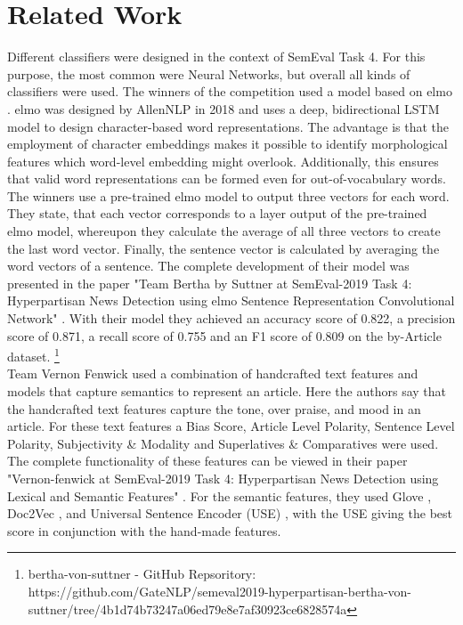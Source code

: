 \documentclass[a4paper, 11pt,titlepage,oneside,openany]{book}
\begin{document}
\chapter{Related Work}
Different classifiers were designed in the context of SemEval Task 4. For this purpose, the most common were Neural Networks, but overall all kinds of classifiers were used. 
\indent The winners of the competition used a model based on \gls{elmo} \cite{elmo}. \gls{elmo} was designed by AllenNLP in 2018 and uses a deep, bidirectional LSTM model to design character-based word representations. The advantage is that the employment of character embeddings makes it possible to identify morphological features which word-level embedding might overlook. Additionally, this ensures that valid word representations can be formed even for out-of-vocabulary words. The winners use a pre-trained \gls{elmo} model to output three vectors for each word. They state, that each vector corresponds to a layer output of the pre-trained \gls{elmo} model, whereupon they calculate the average of all three vectors to create the last word vector. Finally, the sentence vector is calculated by averaging the word vectors of a sentence. The complete development of their model was presented in the paper "Team Bertha by Suttner at SemEval-2019 Task 4: Hyperpartisan News Detection using \gls{elmo} Sentence Representation Convolutional Network" \cite{gewinner}. With their model they achieved an accuracy score of 0.822, a precision score of 0.871, a recall score of 0.755 and an F1 score of 0.809 on the by-Article dataset. \footnote{bertha-von-suttner - GitHub Repsoritory: https://github.com/GateNLP/semeval2019-hyperpartisan-bertha-von-suttner/tree/4b1d74b73247a06ed79e8e7af30923ce6828574a} \\
\indent Team Vernon Fenwick used a combination of handcrafted text features and models that capture semantics to represent an article. Here the authors say that the handcrafted text features capture the tone, over praise, and mood in an article. For these text features a Bias Score, Article Level Polarity, Sentence Level Polarity, Subjectivity \& Modality and Superlatives \& Comparatives were used. The complete functionality of these features can be viewed in their paper "Vernon-fenwick at SemEval-2019 Task 4: Hyperpartisan News Detection using Lexical and Semantic Features" \cite{vernon}. For the semantic features, they used Glove \cite{glove}, Doc2Vec \cite{doc2vec}, and Universal Sentence Encoder (USE) \cite{use}, with the USE giving the best score in conjunction with the hand-made features. 
\end{document}
